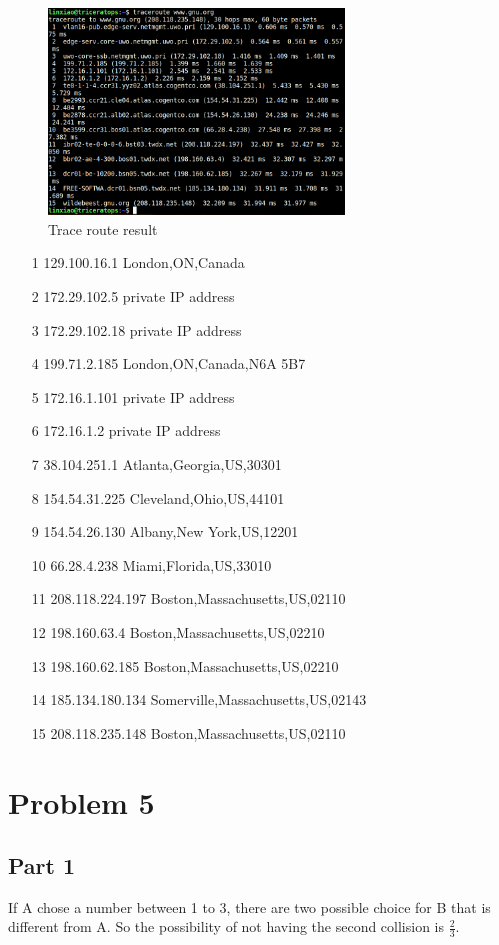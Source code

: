 \documentclass[paper=a4, fontsize=11pt]{scrartcl} %
\numberwithin{equation}{section} %
\numberwithin{figure}{section} %
\numberwithin{table}{section} %
\begin{document}
\begin{figure}[htbp]
	\centering
	\includegraphics[width=0.7\textwidth]{A1Q4.png}
	\caption{Trace route result}
	\label{fig:traceroute}
\end{figure}
\begin{enumerate}
	\item [1] 129.100.16.1 London,ON,Canada
	\item [2] 172.29.102.5 private IP address
	\item [3] 172.29.102.18 private IP address
	\item [4] 199.71.2.185 London,ON,Canada,N6A 5B7
	\item [5] 172.16.1.101 private IP address
	\item [6] 172.16.1.2 private IP address
	\item [7] 38.104.251.1 Atlanta,Georgia,US,30301
	\item [8] 154.54.31.225 Cleveland,Ohio,US,44101
	\item [9] 154.54.26.130 Albany,New York,US,12201
	\item [10] 66.28.4.238 Miami,Florida,US,33010
	\item [11] 208.118.224.197 Boston,Massachusetts,US,02110
	\item [12] 198.160.63.4 Boston,Massachusetts,US,02210
	\item [13] 198.160.62.185 Boston,Massachusetts,US,02210
	\item [14] 185.134.180.134 Somerville,Massachusetts,US,02143
	\item [15] 208.118.235.148 Boston,Massachusetts,US,02110
\end{enumerate}

\section*{Problem 5}
\subsection*{Part 1}
If A chose a number between 1 to 3, there are two possible choice for B that is different from A. So the possibility of not having the second collision is $\frac{2}{3}$.
\end{document}
